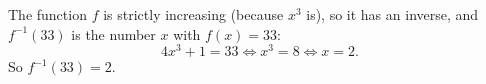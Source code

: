 The function $f$ is strictly increasing (because $x^3$ is), so it has an inverse, and $f^{-1}(33)$ is the number $x$ with $f(x)=33$:
\[4x^3+1=33\iff x^3=8\iff x=2 .\]
So $f^{-1}(33)=\boxed{2}$.
